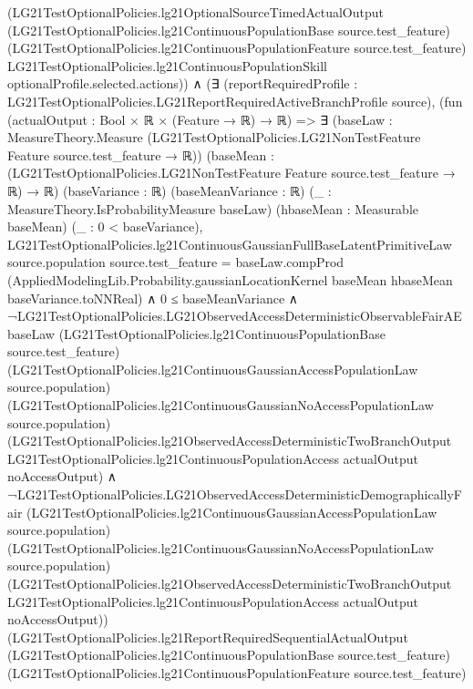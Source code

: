 \documentclass[10pt]{article}
\begin{document}
\begin{ReviewVerbatim}
      (LG21TestOptionalPolicies.lg21OptionalSourceTimedActualOutput
        (LG21TestOptionalPolicies.lg21ContinuousPopulationBase source.test_feature)
        (LG21TestOptionalPolicies.lg21ContinuousPopulationFeature source.test_feature)
        LG21TestOptionalPolicies.lg21ContinuousPopulationSkill optionalProfile.selected.actions)) ∧
  (∃ (reportRequiredProfile : LG21TestOptionalPolicies.LG21ReportRequiredActiveBranchProfile source),
      (fun (actualOutput : Bool × ℝ × (Feature → ℝ) → ℝ) =>
          ∃ (baseLaw :
            MeasureTheory.Measure (LG21TestOptionalPolicies.LG21NonTestFeature Feature source.test_feature → ℝ))
            (baseMean : (LG21TestOptionalPolicies.LG21NonTestFeature Feature source.test_feature → ℝ) → ℝ) (baseVariance
            : ℝ) (baseMeanVariance : ℝ) (_ : MeasureTheory.IsProbabilityMeasure baseLaw) (hbaseMean :
            Measurable baseMean) (_ : 0 < baseVariance),
            LG21TestOptionalPolicies.lg21ContinuousGaussianFullBaseLatentPrimitiveLaw source.population
                  source.test_feature =
                baseLaw.compProd
                  (AppliedModelingLib.Probability.gaussianLocationKernel baseMean hbaseMean baseVariance.toNNReal) ∧
              0 ≤ baseMeanVariance ∧
                ¬LG21TestOptionalPolicies.LG21ObservedAccessDeterministicObservableFairAE baseLaw
                      (LG21TestOptionalPolicies.lg21ContinuousPopulationBase source.test_feature)
                      (LG21TestOptionalPolicies.lg21ContinuousGaussianAccessPopulationLaw source.population)
                      (LG21TestOptionalPolicies.lg21ContinuousGaussianNoAccessPopulationLaw source.population)
                      (LG21TestOptionalPolicies.lg21ObservedAccessDeterministicTwoBranchOutput
                        LG21TestOptionalPolicies.lg21ContinuousPopulationAccess actualOutput noAccessOutput) ∧
                  ¬LG21TestOptionalPolicies.LG21ObservedAccessDeterministicDemographicallyFair
                      (LG21TestOptionalPolicies.lg21ContinuousGaussianAccessPopulationLaw source.population)
                      (LG21TestOptionalPolicies.lg21ContinuousGaussianNoAccessPopulationLaw source.population)
                      (LG21TestOptionalPolicies.lg21ObservedAccessDeterministicTwoBranchOutput
                        LG21TestOptionalPolicies.lg21ContinuousPopulationAccess actualOutput noAccessOutput))
        (LG21TestOptionalPolicies.lg21ReportRequiredSequentialActualOutput
          (LG21TestOptionalPolicies.lg21ContinuousPopulationBase source.test_feature)
          (LG21TestOptionalPolicies.lg21ContinuousPopulationFeature source.test_feature)

\end{ReviewVerbatim}
\end{document}
